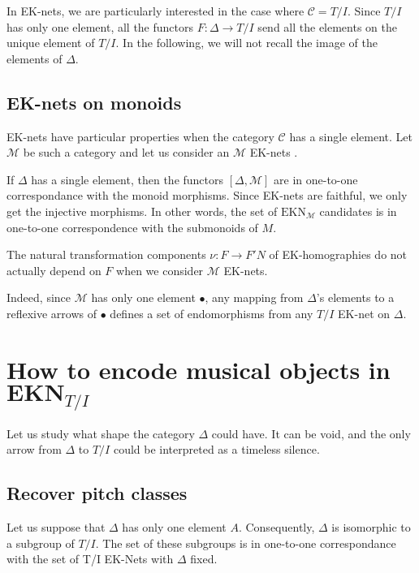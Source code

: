 \documentclass{report}
\begin{document}
In EK-nets, we are particularly interested in the case where $\mathcal{C} = T/I$. Since $T/I$ has only one element, all the functors $F:\Delta \rightarrow T/I$ send all the elements on the unique element of $T/I$. In the following, we will not recall the image of the elements of $\Delta$.

\subsection{EK-nets on monoids}

EK-nets have particular properties when the category $\mathcal{C}$ has a single element. Let $\mathcal{M}$ be such a category and let us consider  an $\mathcal{M}$ EK-nets .

If $\Delta$ has a single element, then the functors $[\Delta,\mathcal{M}]$ are in one-to-one correspondance with the monoid morphisms. Since EK-nets are faithful, we only get the injective morphisms. In other words, the set of $\text{EKN}_{\mathcal{M}}$ candidates is in one-to-one correspondence with the submonoids of $M$. 
    
\begin{prop}
    The natural transformation components $\nu : F \rightarrow F'N$ of EK-homographies do not actually depend on $F$ when we consider $\mathcal{M}$ EK-nets. 
\end{prop}

Indeed, since $\mathcal{M}$ has only one element $\bullet$, any mapping from $\Delta$'s elements to a reflexive arrows of $\bullet$ defines a set of endomorphisms from any $T/I$ EK-net on $\Delta$.



\section{How to encode musical objects in $\textbf{EKN}_{T/I}$}

Let us study what shape the category $\Delta$ could have. It can be void, and the only arrow from $\Delta$ to $T/I$ could be interpreted as a timeless silence.

\subsection{Recover pitch classes}
Let us suppose that $\Delta$ has only one element $A$. Consequently, $\Delta$ is isomorphic to a subgroup of $T/I$. The set of these subgroups is in one-to-one correspondance with the set of T/I EK-Nets with $\Delta$ fixed.
\end{document}
